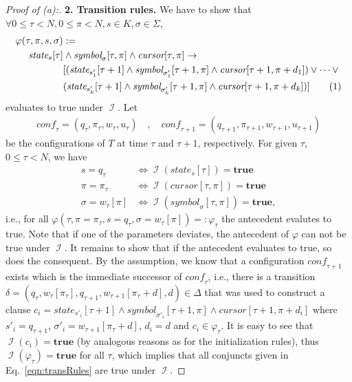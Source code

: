 \documentclass [11pt]{article}
\newcommand{\ra}{\rightarrow}
\renewcommand{\phi}{\varphi}
\newcommand{\sym}[3]{\textit{symbol}_{#1}[#2,#3]}
\newcommand{\cursor}[2]{\textit{cursor}[#1,#2]}
\newcommand{\state}[2]{\textit{state}_{#1}[#2]}
\newcommand{\conf}{\textit{conf}}
\newcommand{\conft}{\ensuremath{\conf_{\tau}}}
\newcommand{\pt}{\ensuremath{\pi_{\tau}}}
\newcommand{\qt}{\ensuremath{q_{\tau}}}
\newcommand{\wt}{\ensuremath{w_{\tau}}}
\newcommand{\ut}{\ensuremath{u_{\tau}}}
\DeclareMathOperator{\II}{\mathcal{I}}
\newcommand{\True}{\mathbf{true}}
\newcommand\numberthis{\addtocounter{equation}{1}\tag{\theequation}}
\newcommand\neqn[1]{\numberthis\label{eqn:#1}}
\begin{document}
\begin{proof}[Proof of (a):]
\smallskip
\noindent
{\bf 2. Transition rules.} We have to show that $\forall 0\leq \tau<N, 0\leq \pi < N, s\in K,  \sigma \in \Sigma$,
\begin{align*}
\phi(\tau, \pi, s, \sigma)& := \\
\state{s}{\tau}& \wedge \sym{\sigma}{\tau}{\pi} \wedge \cursor{\tau}{\pi} \ra  \\
&[({\state{s'_1}{\tau+1}}\wedge \sym{\sigma'_1}{\tau+1}{\pi} \wedge {\cursor{\tau+1}{\pi+d_1}} ) \vee \dots \vee \\
&({\state{s'_k}{\tau+1}} \wedge \sym{\sigma'_k}{\tau+1}{\pi} \wedge {\cursor{\tau+1}{\pi+d_k}} ) ] 
\neqn{transRules}
\end{align*}
evaluates to true under $\II$.
Let
\begin{align*}
 \conf_\tau = (\qt, \pt, \wt, \ut) \quad ,  \quad \conf_{\tau+1} = (q_{\tau+1}, \pi_{\tau+1}, w_{\tau+1}, u_{\tau+1})
\end{align*}
be the configurations of $T$ at time $\tau$ and $\tau+1$, respectively. 
For given $\tau$, $0\leq \tau<N$, we have
\begin{align*}
s=\qt &\iff \II(\state{s}{\tau}) = \True \\
\pi=\pt &\iff \II(\cursor{\tau}{\pi}) = \True \\ 
\sigma=\wt[\pi] &\iff \II(\sym{\sigma}{\tau}{\pi}) = \True,
\end{align*}
i.e., for all $\phi(\tau, \pi=\pt, s=\qt, \sigma = \wt[\pi])=:\phi_{\tau}$ the antecedent evalutes to true.
Note that if one of the parameters deviates, the antecedent of $\phi$ can not be true under $\II$.
It remains to show that if the antecedent evaluates to true, so does the consequent.
By the assumption, we know that a configuration $\conf_{\tau+1}$ exists which is the immediate successor of $\conft$, i.e., there is a transition $\delta = (\qt, \wt[\pt], q_{\tau+1}, w_{\tau+1}[\pt + d], d)\in \Delta$ that was used to construct a clause $c_i = {\state{s'_i}{\tau+1}}\wedge \sym{\sigma'_i}{\tau+1}{\pi} \wedge {\cursor{\tau+1}{\pi+d_i}}$ where
$s'_i=q_{\tau+1}$, $\sigma'_i=w_{\tau+1}[\pt + d]$, $d_i = d$ and $c_i \in \phi_{\tau}$.
It is easy to see that $\II(c_i) = \True$ (by analogous reasons as for the initialization rules), thus $\II(\phi_{\tau}) = \True$ for all $\tau$, which implies that all conjuncts given in Eq.~\ref{eqn:transRules} are true under $\II$.


\end{proof}
\end{document}
